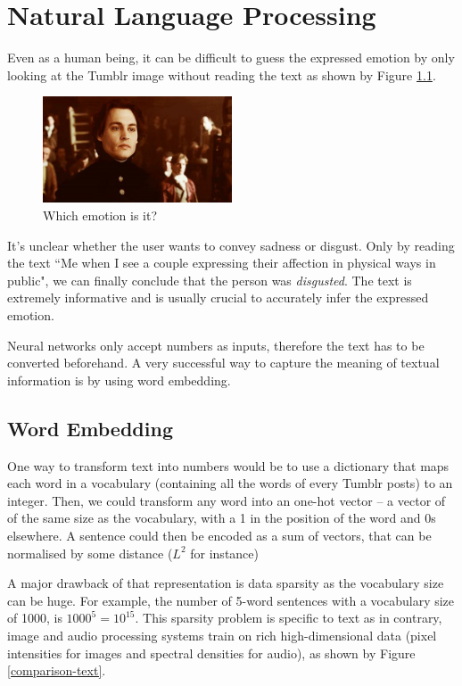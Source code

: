 \chapter{Natural Language Processing}
Even as a human being, it can be difficult to guess the expressed emotion by only looking at the Tumblr image without reading the text as shown by Figure \ref{disgusted-unclear}.

\begin{figure}[H]
    \centering
    \includegraphics[width=0.5\textwidth]{Images/disgusted.jpg}
    \caption{Which emotion is it?}
    \label{disgusted-unclear}
\end{figure}

It's unclear whether the user wants to convey sadness or disgust. Only by reading the text ``Me when I see a couple expressing their affection in physical ways in public", we can finally conclude that the person was {\em disgusted}. The text is extremely informative and is usually crucial to accurately infer the expressed emotion.

Neural networks only accept numbers as inputs, therefore the text has to be converted beforehand. A very successful way to capture the meaning of textual information is by using word embedding.
\newpage
\section{Word Embedding}
One way to transform text into numbers would be to use a dictionary that maps each word in a vocabulary (containing all the words of every Tumblr posts) to an integer. Then, we could transform any word into an one-hot vector -- a vector of of the same size as the vocabulary, with a 1 in the position of the word and 0s elsewhere. A sentence could then be encoded as a sum of vectors, that can be normalised by some distance ($L^2$ for instance)

A major drawback of that representation is data sparsity as the vocabulary size can be huge. For example, the number of 5-word sentences with a vocabulary size of 1000, is $1000^5=10^{15}$. This sparsity problem is specific to text as in contrary, image and audio processing systems train on rich high-dimensional data (pixel intensities for images and spectral densities for audio), as shown by Figure \ref{comparison-text}.

